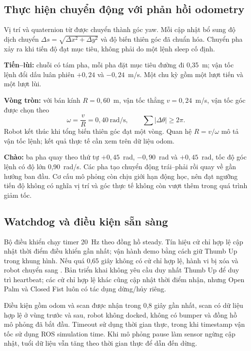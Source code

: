\documentclass[12pt,a4paper]{article}
\newcommand{\code}[1]{\texttt{\detokenize{#1}}}
\begin{document}
\subsection{Thực hiện chuyển động với phản hồi odometry}
Vị trí và quaternion từ  được chuyển thành góc yaw. Mỗi cập nhật bổ sung độ dịch chuyển $\Delta s=\sqrt{\Delta x^2+\Delta y^2}$ và độ biến thiên góc đã chuẩn hóa. Chuyển pha xảy ra khi tiến độ đạt mục tiêu, không phải do một lệnh sleep cố định.

\textbf{Tiến--lùi:} chuỗi có tám pha, mỗi pha đặt mục tiêu đường đi 0,35~m; vận tốc lệnh đổi dấu luân phiên $+0{,}24$ và $-0{,}24$~m/s. Một chu kỳ gồm một lượt tiến và một lượt lùi.

\textbf{Vòng tròn:} với bán kính $R=0{,}60$~m, vận tốc thẳng $v=0{,}24$~m/s, vận tốc góc được chọn theo
\begin{equation}
 \omega=\frac{v}{R}=0{,}40\ \text{rad/s},\qquad
 \sum |\Delta\theta|\geq 2\pi.
\end{equation}
Robot kết thúc khi tổng biến thiên góc đạt một vòng. Quan hệ $R=v/\omega$ mô tả vận tốc lệnh; kết quả thực tế cần xem trên dữ liệu odom.

\textbf{Chào:} ba pha quay theo thứ tự $+0{,}45$~rad, $-0{,}90$~rad và $+0{,}45$~rad, tốc độ góc lệnh có độ lớn 0,90~rad/s. Các pha tạo chuyển động trái--phải rồi quay về gần hướng ban đầu. Cơ cấu mô phỏng còn chịu giới hạn động học, nên đạt ngưỡng tiến độ không có nghĩa vị trí và góc thực tế không còn vượt thêm trong quá trình giảm tốc.

\subsection{Watchdog và điều kiện sẵn sàng}
Bộ điều khiển chạy timer 20~Hz theo đồng hồ steady. Tín hiệu cử chỉ hợp lệ cập nhật thời điểm điều khiển gần nhất; vận hành demo bằng cách giữ Thumb Up trong khung hình. Nếu quá 0,65 giây không có cử chỉ hợp lệ, hành vi bị xóa và robot chuyển sang \code{SIGNAL_LOST}. Bản triển khai không yêu cầu duy nhất Thumb Up để duy trì heartbeat; các cử chỉ hợp lệ khác cũng cập nhật thời điểm nhận, nhưng Open Palm và Closed Fist luôn có tác dụng dừng/hủy riêng.

Điều kiện \code{ready=True} gồm odom và scan được nhận trong 0,8 giây gần nhất, scan có dữ liệu hợp lệ ở vùng trước và sau, robot không docked, không có bumper và đồng hồ mô phỏng đã bắt đầu. Timeout sử dụng thời gian thực, trong khi timestamp vận tốc sử dụng ROS simulation time. Khi mô phỏng pause làm sensor ngừng cập nhật, tuổi dữ liệu vẫn tăng theo thời gian thực để dẫn đến dừng.
\end{document}
